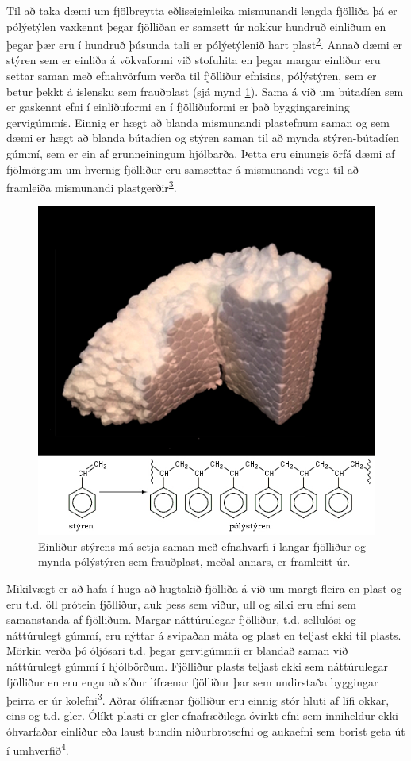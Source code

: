 \documentclass[icelandic,]{book}
\begin{document}
Til að taka dæmi um fjölbreytta eðliseiginleika mismunandi lengda fjölliða þá er pólýetýlen vaxkennt þegar fjölliðan er samsett úr nokkur hundruð einliðum en þegar þær eru í hundruð þúsunda tali er pólýetýlenið hart plast\textsuperscript{\protect\hyperlink{ref-Andrady2017}{2}}. Annað dæmi er stýren sem er einliða á vökvaformi við stofuhita en þegar margar einliður eru settar saman með efnahvörfum verða til fjölliður efnisins, pólýstýren, sem er betur þekkt á íslensku sem frauðplast (sjá mynd \ref{fig:styren}). Sama á við um bútadíen sem er gaskennt efni í einliðuformi en í fjölliðuformi er það byggingareining gervigúmmís. Einnig er hægt að blanda mismunandi plastefnum saman og sem dæmi er hægt að blanda bútadíen og stýren saman til að mynda stýren-bútadíen gúmmí, sem er ein af grunneiningum hjólbarða. Þetta eru einungis örfá dæmi af fjölmörgum um hvernig fjölliður eru samsettar á mismunandi vegu til að framleiða mismunandi plastgerðir\textsuperscript{\protect\hyperlink{ref-Gowariker2005}{3}}.

\begin{figure}

{\centering \includegraphics[width=0.7\linewidth]{myndir/polystyrene} 

}

\caption{Einliður stýrens má setja saman með efnahvarfi í langar fjölliður og mynda pólýstýren sem frauðplast, meðal annars, er framleitt úr.}\label{fig:styren}
\end{figure}

Mikilvægt er að hafa í huga að hugtakið fjölliða á við um margt fleira en plast og eru t.d. öll prótein fjölliður, auk þess sem viður, ull og silki eru efni sem samanstanda af fjölliðum. Margar náttúrulegar fjölliður, t.d. sellulósi og náttúrulegt gúmmí, eru nýttar á svipaðan máta og plast en teljast ekki til plasts. Mörkin verða þó óljósari t.d. þegar gervigúmmíi er blandað saman við náttúrulegt gúmmí í hjólbörðum. Fjölliður plasts teljast ekki sem náttúrulegar fjölliður en eru engu að síður lífrænar fjölliður þar sem undirstaða byggingar þeirra er úr kolefni\textsuperscript{\protect\hyperlink{ref-Gowariker2005}{3}}. Aðrar ólífrænar fjölliður eru einnig stór hluti af lífi okkar, eins og t.d. gler. Ólíkt plasti er gler efnafræðilega óvirkt efni sem inniheldur ekki óhvarfaðar einliður eða laust bundin niðurbrotsefni og aukaefni sem borist geta út í umhverfið\textsuperscript{\protect\hyperlink{ref-Gudjonsdottir2015}{4}}.
\end{document}
